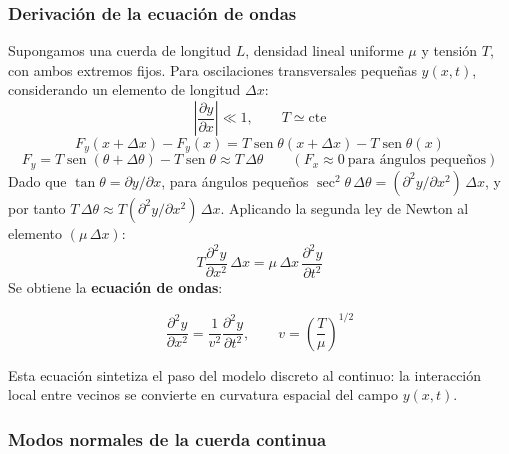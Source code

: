 \documentclass[12pt, a4paper]{article}
\theoremstyle{plain}
\theoremstyle{definition}
\theoremstyle{remark}
\DeclareMathOperator{\sen}{sen}
\begin{document}
\subsubsection{Derivación de la ecuación de ondas}

Supongamos una cuerda de longitud $L$, densidad lineal uniforme $\mu$ y tensión $T$, con
ambos extremos fijos. Para oscilaciones transversales pequeñas $y(x,t)$, considerando un
elemento de longitud $\Delta x$:
\begin{equation}
  \left|\frac{\partial y}{\partial x}\right|\ll 1,\qquad T\simeq \text{cte}
\end{equation}
\[
  F_y(x+\Delta x)-F_y(x)
  =T\sen\theta(x+\Delta x)-T\sen\theta(x)
\]
\begin{equation}
  F_y = T\sen(\theta+\Delta\theta) - T\sen\theta \approx T\,\Delta\theta
  \qquad (F_x \approx 0\ \text{para ángulos pequeños})
\end{equation}
Dado que $\tan\theta = \partial y/\partial x$, para ángulos pequeños
$\sec^2\theta\,\Delta\theta = (\partial^2 y/\partial x^2)\,\Delta x$, y por tanto
$T\,\Delta\theta \approx T(\partial^2 y/\partial x^2)\,\Delta x$. Aplicando la segunda
ley de Newton al elemento $(\mu\,\Delta x)$:
\begin{equation}
  T\frac{\partial^2 y}{\partial x^2}\,\Delta x = \mu\,\Delta x\,\frac{\partial^2 y}{\partial t^2}
\end{equation}
Se obtiene la \textbf{ecuación de ondas}:
\begin{mdframed}[style=resultado]
\begin{equation}
  \frac{\partial^2 y}{\partial x^2} = \frac{1}{v^2}\frac{\partial^2 y}{\partial t^2},
  \qquad
  v = \left(\frac{T}{\mu}\right)^{\!1/2}
\end{equation}
\end{mdframed}
Esta ecuación sintetiza el paso del modelo discreto al continuo: la interacción local entre
vecinos se convierte en curvatura espacial del campo $y(x,t)$.

\subsubsection{Modos normales de la cuerda continua}
\end{document}
